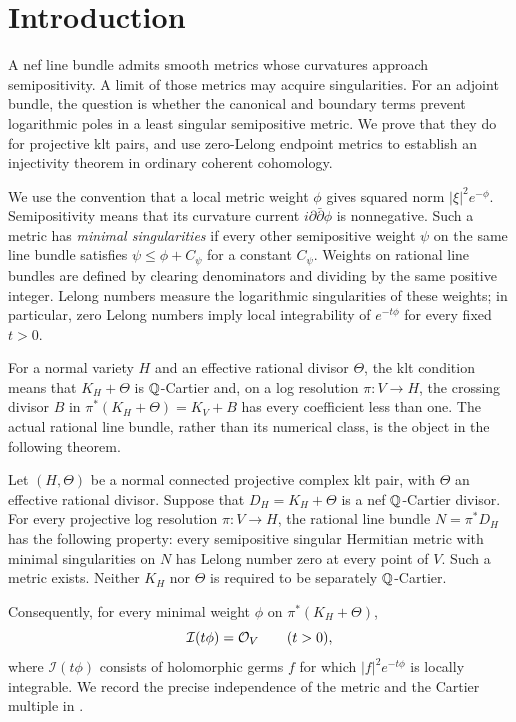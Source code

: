 \section{Introduction}\label{sec:introduction}

A nef line bundle admits smooth metrics whose curvatures approach
semipositivity. A limit of those metrics may acquire singularities.
For an adjoint bundle, the question is whether the canonical and boundary
terms prevent logarithmic poles in a least singular semipositive metric.
We prove that they do for projective klt pairs, and use zero-Lelong
endpoint metrics to establish an injectivity theorem in ordinary
coherent cohomology.

We use the convention that a local metric weight $\phi$ gives squared
norm $|\xi|^2e^{-\phi}$. Semipositivity means that its curvature current
$i\partial\bar\partial\phi$ is nonnegative. Such a metric has
\emph{minimal singularities} if every other semipositive weight $\psi$
on the same line bundle satisfies $\psi\le\phi+C_\psi$ for a constant
$C_\psi$. Weights on rational line bundles are defined by clearing
denominators and dividing by the same positive integer. Lelong numbers
measure the logarithmic singularities of these weights; in particular,
zero Lelong numbers imply local integrability of $e^{-t\phi}$ for every
fixed $t>0$.

For a normal variety $H$ and an effective rational divisor $\Theta$,
the klt condition means that $K_H+\Theta$ is $\mathbb Q$-Cartier and, on a
log resolution $\pi:V\to H$, the crossing divisor $B$ in
$\pi^*(K_H+\Theta)=K_V+B$ has every coefficient less than one.
The actual rational line bundle, rather than its numerical class,
is the object in the following theorem.

\begin{theorem}\label{thm:adjoint-metric}
Let $(H,\Theta)$ be a normal connected projective complex klt pair, with
$\Theta$ an effective rational divisor.  Suppose that
$D_H=K_H+\Theta$ is a nef $\mathbb Q$-Cartier divisor.  For every projective log
resolution $\pi:V\to H$, the rational line bundle $N=\pi^*D_H$ has the following property: every semipositive singular Hermitian
metric with minimal singularities on $N$ has Lelong number zero
at every point of $V$. Such a metric exists. Neither $K_H$ nor $\Theta$ is required to be separately $\mathbb Q$-Cartier.
\end{theorem}

Consequently, for every minimal weight $\phi$ on $\pi^*(K_H+\Theta)$,
\[
                    \mathcal I(t\phi)=\mathcal O_V\qquad(t>0),
\]
where $\mathcal I(t\phi)$ consists of holomorphic germs $f$ for which
$|f|^2e^{-t\phi}$ is locally integrable. We record the precise independence
of the metric and the Cartier multiple in
.

